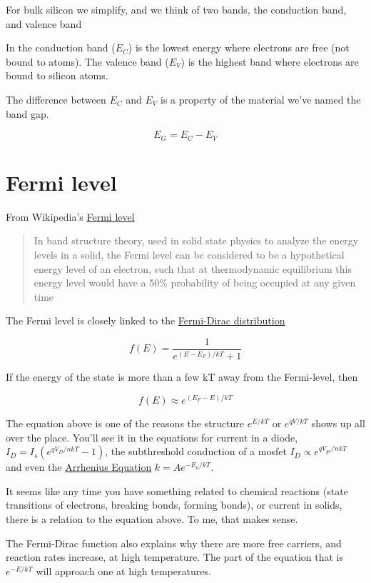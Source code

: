 For bulk silicon we simplify, and we think of two bands, the conduction
band, and valence band

In the conduction band (\(E_C\)) is the lowest energy where electrons
are free (not bound to atoms). The valence band (\(E_V\)) is the highest
band where electrons are bound to silicon atoms.

The difference between \(E_C\) and \(E_V\) is a property of the material
we've named the band gap.

\[ E_G = E_C - E_V\]

\section{Fermi level}\label{fermi-level}

From Wikipedia's \href{https://en.wikipedia.org/wiki/Fermi_level}{Fermi
level}

\begin{quote}
In band structure theory, used in solid state physics to analyze the
energy levels in a solid, the Fermi level can be considered to be a
hypothetical energy level of an electron, such that at thermodynamic
equilibrium this energy level would have a 50\% probability of being
occupied at any given time
\end{quote}

The Fermi level is closely linked to the
\href{https://en.wikipedia.org/wiki/Fermi\%E2\%80\%93Dirac_statistics}{Fermi-Dirac
distribution}

\[
f(E) = \frac{1}{e^{(E - E_F)/kT} + 1}
\]

If the energy of the state is more than a few kT away from the
Fermi-level, then

\[
f(E) \approx e^{(E_F - E)/kT}
\]

The equation above is one of the reasons the structure \(e^{E/kT}\) or
\(e^{qV/kT}\) shows up all over the place. You'll see it in the
equations for current in a diode, \(I_D = I_s (e^{q V_D/nkT} -1)\), the
subthreshold conduction of a mosfet \(I_D \propto e^{q V_{gs}/nkT}\) and
even the
\href{https://en.wikipedia.org/wiki/Arrhenius_equation}{Arrhenius
Equation} \(k = A e^{-E_a/kT}\).

It seems like any time you have something related to chemical reactions
(state transitions of electrons, breaking bonds, forming bonds), or
current in solids, there is a relation to the equation above. To me,
that makes sense.

The Fermi-Dirac function also explains why there are more free carriers,
and reaction rates increase, at high temperature. The part of the
equation that is \(e^{-E/kT}\) will approach one at high temperatures.

